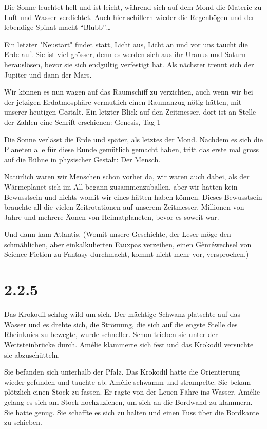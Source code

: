 \documentclass[11pt,titlepage,a5paper]{book}
\begin{document}
Die Sonne leuchtet hell und ist leicht, während sich auf dem Mond die Materie zu Luft und Wasser verdichtet. Auch hier schillern wieder die Regenbögen und der lebendige Spinat macht "`Blubb"'\dots

Ein letzter "Neustart" findet statt, Licht aus, Licht an und vor uns taucht die Erde auf. Sie ist viel grösser, denn es werden sich aus ihr Uranus und Saturn herauslösen, bevor sie sich endgültig verfestigt hat. Als nächster trennt sich der Jupiter und dann der Mars.

Wir können es nun wagen auf das Raumschiff zu verzichten, auch wenn wir bei der jetzigen Erdatmosphäre vermutlich einen Raumanzug nötig hätten, mit unserer heutigen Gestalt.
Ein letzter Blick auf den Zeitmesser, dort ist an Stelle der Zahlen eine Schrift erschienen: Genesis, Tag 1

Die Sonne verlässt die Erde und später, als letztes der Mond. Nachdem es sich die Planeten alle für diese Runde gemütlich gemacht haben, tritt das erste mal gross auf die Bühne in physischer Gestalt: Der Mensch.

Natürlich waren wir Menschen schon vorher da, wir waren auch dabei, als der Wärmeplanet sich im All begann zusammenzuballen, aber wir hatten kein Bewusstsein und nichts womit wir eines hätten haben können. Dieses Bewusstsein brauchte all die vielen Zeitrotationen auf unserem Zeitmesser, Millionen von Jahre und mehrere Äonen von Heimatplaneten, bevor es soweit war.

Und dann kam Atlantis. (Womit unsere Geschichte, der Leser möge den schmählichen, aber einkalkulierten Fauxpas verzeihen, einen Gènréwechsel von Science-Fiction zu Fantasy durchmacht, kommt nicht mehr vor, versprochen.)

\section*{2.2.5}

Das Krokodil schlug wild um sich. Der mächtige Schwanz platschte auf das Wasser und es drehte sich, die Strömung, die sich auf die engste Stelle des Rheinknies zu bewegte, wurde schneller. Schon trieben sie unter der Wettsteinbrücke durch. Amélie klammerte sich fest und das Krokodil versuchte sie abzuschütteln.

Sie befanden sich unterhalb der Pfalz. Das Krokodil hatte die Orientierung wieder gefunden und tauchte ab. Amélie schwamm und strampelte. Sie bekam plötzlich einen Stock zu fassen. Er ragte von der Leuen-Fähre ins Wasser. Amélie gelang es sich am Stock hochzuziehen, um sich an die Bordwand zu klammern. Sie hatte genug. Sie schaffte es sich zu halten und einen Fuss über die Bordkante zu schieben. 
\end{document}
